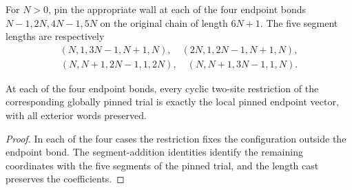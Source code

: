 \begin{definition}
    \label{def:uncle_pinned_global_trials}
    \leanok
    For $N>0$, pin the appropriate wall at each of the four endpoint
    bonds $N-1,2N,4N-1,5N$ on the original chain of length $6N+1$.
    The five segment lengths are respectively
    \begin{align}
        (N,1,3N-1,N+1,N),\quad(2N,1,2N-1,N+1,N),
    \end{align}
    \begin{align}
        (N,N+1,2N-1,1,2N),\quad(N,N+1,3N-1,1,N).
    \end{align}
\end{definition}

\begin{lemma}
    \label{lem:uncle_pinned_global_trial_restrictions}
    \leanok
    At each of the four endpoint bonds, every cyclic two-site restriction
    of the corresponding globally pinned trial is exactly the local pinned
    endpoint vector, with all exterior words preserved.
\end{lemma}
\begin{proof}
    \leanok
    In each of the four cases the restriction fixes the configuration
    outside the endpoint bond. The segment-addition identities identify
    the remaining coordinates with the five segments of the pinned trial,
    and the length cast preserves the coefficients.
\end{proof}


